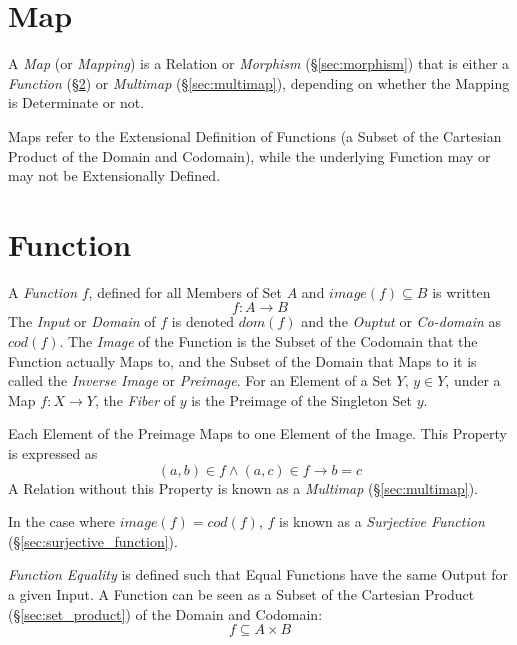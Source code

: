\section{Map}\label{sec:set_map}

A \emph{Map} (or \emph{Mapping}) is a Relation or \emph{Morphism}
(\S\ref{sec:morphism}) that is either a \emph{Function}
(\S\ref{sec:set_function}) or \emph{Multimap} (\S\ref{sec:multimap}),
depending on whether the Mapping is Determinate or not.

Maps refer to the Extensional Definition of Functions (a Subset of the
Cartesian Product of the Domain and Codomain), while the underlying
Function may or may not be Extensionally Defined.



\section{Function}\label{sec:set_function}

A \emph{Function} $f$, defined for all Members of Set $A$ and $image(f)
\subseteq B$ is written
\[
    f : A \rightarrow B
\]
The \emph{Input} or \emph{Domain} of $f$ is denoted $dom(f)$ and the
\emph{Ouptut} or \emph{Co-domain} as $cod(f)$. The \emph{Image} of the
Function is the Subset of the Codomain that the Function actually Maps
to, and the Subset of the Domain that Maps to it is called the
\emph{Inverse Image} or \emph{Preimage}. For an Element of a Set $Y$,
$y \in Y$, under a Map $f: X \rightarrow Y$, the \emph{Fiber} of $y$
is the Preimage of the Singleton Set ${y}$.

Each Element of the Preimage Maps to one Element of the Image. This
Property is expressed as
\[
    (a,b) \in f \wedge (a,c) \in f \rightarrow b = c
\]
A Relation without this Property is known as a \emph{Multimap}
(\S\ref{sec:multimap}).

In the case where $image(f) = cod(f)$, $f$ is known as a
\emph{Surjective Function} (\S\ref{sec:surjective_function}).

\emph{Function Equality} is defined such that Equal Functions have the
same Output for a given Input. A Function can be seen as a Subset of
the Cartesian Product (\S\ref{sec:set_product}) of the Domain and
Codomain:
\[
    f \subseteq A \times B
\]

